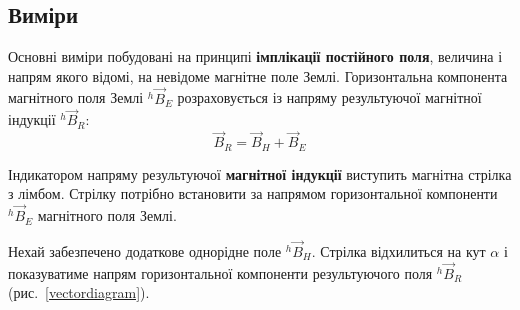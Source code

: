 \subsection{Виміри}

Основні виміри %
побудовані на принципі \textbf{імплікації постійного поля}, величина і напрям якого відомі, на невідоме магнітне поле Землі. Горизонтальна компонента магнітного поля Землі
$ {}^{h}\vec{B}_{E} $ %
розраховується із напряму результуючої магнітної індукції ${}^{h}\vec{B}_{R}$:
%
\begin{equation} \label{Horizontalcomponent} %
    \vec{B}_{R} =  \vec{B}_{H} +  \vec{B}_{E}
\end{equation}


Індикатором напряму результуючої \textbf{магнітної індукції} виступить магнітна стрілка з лімбом. Стрілку потрібно встановити за напрямом горизонтальної компоненти $ {}^{h}\vec{B}_{E} $ магнітного поля Землі.

Нехай забезпечено
додаткове однорідне поле $ {}^{h}\vec{B}_{H} $.
Стрілка відхилиться на кут $\alpha$ і показуватиме напрям горизонтальної компоненти результуючого поля ${}^{h}\vec{B}_{R}$ (рис.~\ref{vectordiagram}).


